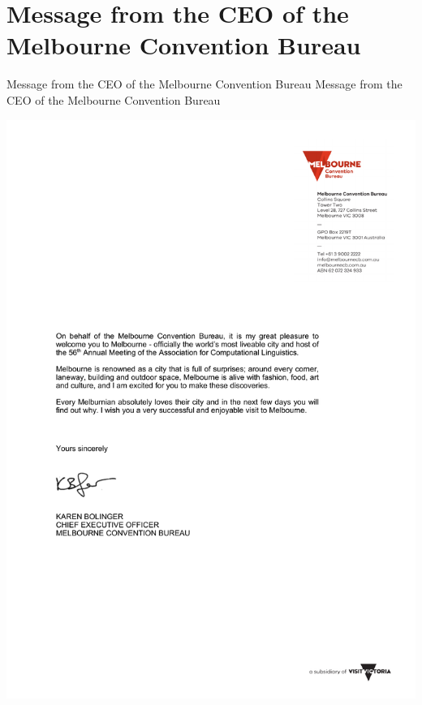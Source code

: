 \section{Message from the CEO of the Melbourne Convention Bureau}
\setheaders%
    {Message from the CEO of the Melbourne Convention Bureau}%
    {Message from the CEO of the Melbourne Convention Bureau}
\thispagestyle{emptyheader}

%
\includegraphics[scale=0.54]{content/welcome/welcome_letter.pdf}
